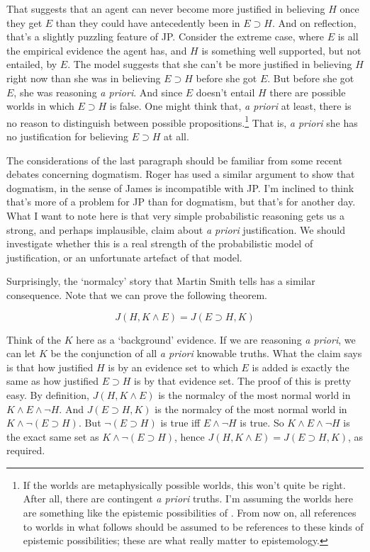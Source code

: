 \noindent That suggests that an agent can never become more justified in believing $H$ once they get $E$ than they could have antecedently been in $E \supset H$. And on reflection, that's a slightly puzzling feature of JP. Consider the extreme case, where $E$ is all the empirical evidence the agent has, and $H$ is something well supported, but not entailed, by $E$. The model suggests that she can't be more justified in believing $H$ right now than she was in believing $E \supset H$ before she got $E$. But before she got $E$, she was reasoning \emph{a priori}. And since $E$ doesn't entail $H$ there are possible worlds in which $E \supset H$ is false. One might think that, \emph{a priori} at least, there is no reason to distinguish between possible propositions.\footnote{If the worlds are metaphysically possible worlds, this won't quite be right. After all, there are contingent \emph{a priori} truths. I'm assuming the worlds here are something like the epistemic possibilities of \citet{Chalmers2011}. From now on, all references to worlds in what follows should be assumed to be references to these kinds of epistemic possibilities; these are what really matter to epistemology.} That is, \emph{a priori} she has no justification for believing $E \supset H$ at all.

The considerations of the last paragraph should be familiar from some recent debates concerning dogmatism. Roger \citet{White2006} has used a similar argument to show that dogmatism, in the sense of James \citet{Pryor2000} is incompatible with JP. I'm inclined to think that's more of a problem for JP than for dogmatism, but that's for another day. What I want to note here is that very simple probabilistic reasoning gets us a strong, and perhaps implausible, claim about \emph{a priori} justification. We should investigate whether this is a real strength of the probabilistic model of justification, or an unfortunate artefact of that model.

Surprisingly, the `normalcy' story that Martin Smith tells has a similar consequence. Note that we can prove the following theorem.


\begin{equation}
J(H, K \wedge E) = J(E \supset H, K)
\end{equation}

\noindent  Think of the $K$ here as a `background' evidence. If we are reasoning \emph{a priori}, we can let $K$ be the conjunction of all \emph{a priori} knowable truths. What the claim says is that how justified $H$ is by an evidence set to which $E$ is added is exactly the same as how justified $E \supset H$ is by that evidence set. The proof of this is pretty easy. By definition, $J(H, K \wedge E)$ is the normalcy of the most normal world in $K \wedge E \wedge \neg H$. And $J(E \supset H, K)$ is the normalcy of the most normal world in $K \wedge \neg (E \supset H)$. But $\neg (E \supset H)$ is true iff $E \wedge \neg H$ is true. So $K \wedge E \wedge \neg H$ is the exact same set as $K \wedge \neg (E \supset H)$, hence $J(H, K \wedge E) = J(E \supset H, K)$, as required.

